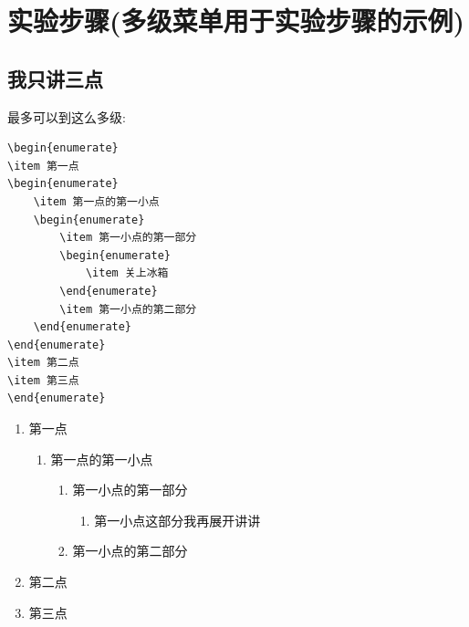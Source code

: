 \documentclass[11pt]{article}
\begin{document}
\section{实验步骤(多级菜单用于实验步骤的示例)}

\subsection{我只讲三点}
最多可以到这么多级: 
\begin{lstlisting}
\begin{enumerate}
\item 第一点
\begin{enumerate}
    \item 第一点的第一小点
    \begin{enumerate}
        \item 第一小点的第一部分
        \begin{enumerate}
            \item 关上冰箱
        \end{enumerate}
        \item 第一小点的第二部分
    \end{enumerate}
\end{enumerate}
\item 第二点
\item 第三点
\end{enumerate}
\end{lstlisting}

\begin{enumerate}
\item 第一点
\begin{enumerate}
    \item 第一点的第一小点
    \begin{enumerate}
        \item 第一小点的第一部分
        \begin{enumerate}
            \item 第一小点这部分我再展开讲讲
        \end{enumerate}
        \item 第一小点的第二部分
    \end{enumerate}
\end{enumerate}
\item 第二点
\item 第三点
\end{enumerate}
\end{document}

